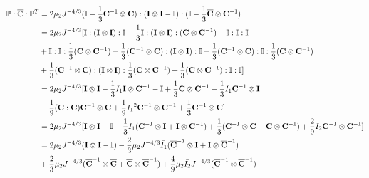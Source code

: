 \begin{equation} \label{part1}
\begin{split}
\mathbb{P} : {\overline{\mathbb{C}}} : {\mathbb{P}}^T &= 2\mu_2{J^{-4/3}} (\mathbb{I} - \frac{1}{3}{\bold{C}}^{-1} \otimes {\bold{C}})
: (\bold{I} \otimes \bold{I} - \mathbb{I}) : (\mathbb{I} - \frac{1}{3}\overline{\bold{C}} \otimes {\bold{C}}^{-1}) \\
&= 2\mu_2{J^{-4/3}}[\mathbb{I} : (\bold{I} \otimes \bold{I}) : \mathbb{I} - \frac{1}{3}\mathbb{I} : (\bold{I} \otimes \bold{I}) : ({{\bold{C}}} \otimes {{\bold{C}}}^{-1}) - \mathbb{I} : \mathbb{I} : \mathbb{I} \\
&+ \mathbb{I} : \mathbb{I} : \frac{1}{3}({\bold{C}} \otimes {{\bold{C}}}^{-1}) - 
\frac{1}{3}({{\bold{C}}}^{-1} \otimes {\bold{C}} ) : (\bold{I} \otimes \bold{I}) : \mathbb{I}
- \frac{1}{3}({{\bold{C}}}^{-1} \otimes {\bold{C}} ) :  \mathbb{I} : \frac{1}{3}({{\bold{C}}} \otimes {{\bold{C}} }^{-1}) \\
&+ \frac{1}{3}({{\bold{C}}}^{-1} \otimes {\bold{C}} ) : (\bold{I} \otimes \bold{I}) : \frac{1}{3}({{\bold{C}}} \otimes {{\bold{C}}}^{-1} ) + \frac{1}{3}({{\bold{C}}} \otimes {{\bold{C}}}^{-1}) : \mathbb{I} : \mathbb{I}
] \\
&= 2\mu_2{J^{-4/3}}[\bold{I} \otimes \bold{I} - \frac{1}{3}{I_1}\bold{I} \otimes {{\bold{C}}}^{-1} - \mathbb{I} + \frac{1}{3}{\bold{C}} \otimes {{\bold{C}}}^{-1} -  \frac{1}{3}{I_1}{{\bold{C}}}^{-1} \otimes \bold{I} \\
&- \frac{1}{9}({\bold{C}} : {\bold{C}}){{\bold{C}}}^{-1} \otimes {{\bold{C}}} + \frac{1}{9}{{I_1}}^2{{\bold{C}}}^{-1} \otimes {{\bold{C}}}^{-1} +  \frac{1}{3}{{\bold{C}}}^{-1} \otimes {{\bold{C}}}] \\
&= 2\mu_2{J}^{-4/3}[\bold{I} \otimes \bold{I} - \mathbb{I} - \frac{1}{3}{I_1}({{\bold{C}}}^{-1} \otimes \bold{I} + \bold{I}\otimes{{\bold{C}}}^{-1} ) +
\frac{1}{3}({{\bold{C}}}^{-1} \otimes {\bold{C}} + {\bold{C}}\otimes{{\bold{C}}}^{-1} )  + \frac{2}{9}{I_2} {{\bold{C}}}^{-1} \otimes {{\bold{C}}}^{-1}] \\
&= 2\mu_2{J}^{-4/3}(\bold{I} \otimes \bold{I} - \mathbb{I}) - \frac{2}{3}\mu_2J^{-4/3}\bar{I_1}({\overline{\bold{C}}}^{-1} \otimes \bold{I} + \bold{I} \otimes {\overline{\bold{C}}}^{-1}) \\
&+
\frac{2}{3}\mu_2J^{-4/3}({\overline{\bold{C}}}^{-1} \otimes {\overline{\bold{C}}} + {\overline{\bold{C}}} \otimes {\overline{\bold{C}}}^{-1}) + \frac{4}{9}\mu_2\bar{I_2}J^{-4/3}({\overline{\bold{C}}}^{-1} \otimes {\overline{\bold{C}}}^{-1})
\end{split}
\end{equation}
